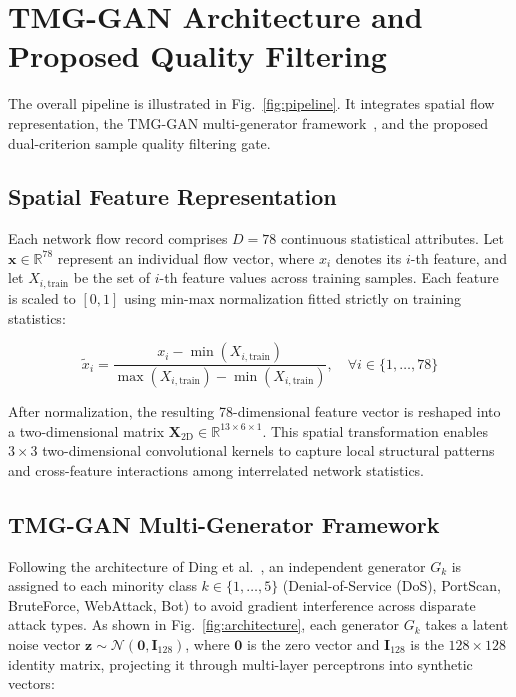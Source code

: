 \documentclass[conference]{IEEEtran}
\begin{document}
\section{TMG-GAN Architecture and Proposed Quality Filtering}

The overall pipeline is illustrated in Fig.~\ref{fig:pipeline}. It integrates spatial flow representation, the TMG-GAN multi-generator framework~\cite{ding2024tmggan}, and the proposed dual-criterion sample quality filtering gate.

\subsection{Spatial Feature Representation}

Each network flow record comprises $D = 78$ continuous statistical attributes. Let $\mathbf{x} \in \mathbb{R}^{78}$ represent an individual flow vector, where $x_i$ denotes its $i$-th feature, and let $X_{i,\text{train}}$ be the set of $i$-th feature values across training samples. Each feature is scaled to $[0, 1]$ using min-max normalization fitted strictly on training statistics:

\begin{equation}
\tilde{x}_i = \frac{x_i - \min(X_{i,\text{train}})}{\max(X_{i,\text{train}}) - \min(X_{i,\text{train}})}, \quad \forall i \in \{1, \dots, 78\}
\end{equation}

After normalization, the resulting 78-dimensional feature vector is reshaped into a two-dimensional matrix $\mathbf{X}_{\text{2D}} \in \mathbb{R}^{13 \times 6 \times 1}$. This spatial transformation enables $3 \times 3$ two-dimensional convolutional kernels to capture local structural patterns and cross-feature interactions among interrelated network statistics.

\subsection{TMG-GAN Multi-Generator Framework}

Following the architecture of Ding et al.~\cite{ding2024tmggan}, an independent generator $G_k$ is assigned to each minority class $k \in \{1, \dots, 5\}$ (Denial-of-Service (DoS), PortScan, BruteForce, WebAttack, Bot) to avoid gradient interference across disparate attack types. As shown in Fig.~\ref{fig:architecture}, each generator $G_k$ takes a latent noise vector $\mathbf{z} \sim \mathcal{N}(\mathbf{0}, \mathbf{I}_{128})$, where $\mathbf{0}$ is the zero vector and $\mathbf{I}_{128}$ is the $128 \times 128$ identity matrix, projecting it through multi-layer perceptrons into synthetic vectors:
\end{document}
